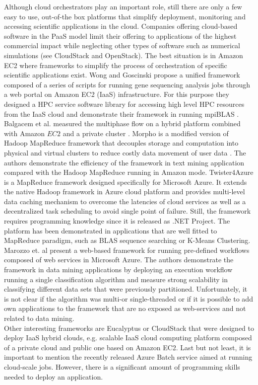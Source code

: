 \documentclass[a4paper,twoside]{article}
\begin{document}
Although cloud orchestrators play an important role, still there are only a few easy to use, out-of-the box platforms that simplify deployment, monitoring and accessing scientific applications in the cloud. Companies offering cloud-based software in the PaaS model limit their offering to applications of the highest commercial impact while neglecting other types of software such as numerical simulations (see CloudStack and OpenStack). The best situation is in Amazon EC2 where frameworks to simplify the process of orchestration of specific scientific applications exist. Wong and Goscinski propose a unified framework composed of a series of scripts for running gene sequencing analysis jobs through a web portal \cite{Wong2013} on Amazon EC2 (IaaS) infrastructure. For this purpose they designed a HPC service software library for accessing high level HPC resources from the IaaS cloud and demonstrate their framework in running mpiBLAS . Balgacem et al. measured the multiphase flow on a hybrid platform combined with Amazon $EC2$ and a private cluster \cite{BenBelgacem2015}. Morpho is a modified version of Hadoop MapReduce framework that decouples storage and computation into physical and virtual clusters to reduce costly data movement of user data \cite{Lu2014}. The authors demonstrate the efficiency of the  framework in text mining application compared with the Hadoop MapReduce running in Amazon mode. Twister4Azure is a MapReduce framework designed specifically for Microsoft Azure. It extends the native Hadoop framework in Azure cloud platform and provides multi-level data caching mechanism to overcome the latencies of cloud services as well as a decentralized task scheduling to avoid single point of failure. Still, the framework requires programming knowledge since it is released as .NET Project. The platform has been demonstrated in applications that are well fitted to MapReduce paradigm, such as BLAS sequence searching or K-Means Clustering. Marozzo et. al \cite{catlett2013cloud} present a web-based framework for running pre-defined workflows composed of web services in Microsoft Azure. The authors demonstrate the framework in data mining applications by deploying an execution workflow running a single classification algorithm and measure strong scalability in classifying different data sets that were previously partitioned. Unfortunately, it is not clear if the algorithm was multi-or single-threaded or if it is possible to add own applications to the framework that are no exposed as web-services and not related to data mining. \\
Other interesting frameworks are Eucalyptus or CloudStack that were designed to deploy IaaS hybrid clouds, e.g. scalable IaaS cloud computing platform composed of a private cloud and public one based on Amazon EC2. Last but not least, it is important to mention the recently released Azure Batch service aimed at running cloud-scale jobs. However, there is a significant amount of programming skills needed to deploy an application.
\end{document}
